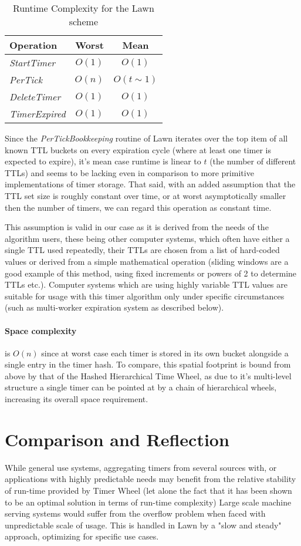 \documentclass[acmsmall]{acmart} %
\newcommand{\advcomplexity}[9]{
\begin{table}[h!]
	\begin{center}
		\begin{tabular}{l|c|c}
			\textbf{Operation} & \textbf{Worst} & \textbf{Mean} \\
			\hline
			\textit{StartTimer} & $O(#1)$ & $O(#2)$ \\
			\textit{PerTick} & $O(#3)$ & $O(#4)$ \\
			\textit{DeleteTimer} & $O(#5)$ & $O(#6)$ \\
			\textit{TimerExpired} & $O(#7)$ & $O(#8)$ \\
		\end{tabular}
		\caption{Runtime Complexity for #9 scheme}
	\end{center}
\end{table}
}
\begin{document}
\advcomplexity{1}{1}{n}{t\sim1}{1}{1}{1}{1}{the Lawn}

Since the \textit{PerTickBookkeeping} routine of Lawn iterates over the top item of all known TTL buckets on every expiration cycle (where at least one timer is expected to expire), it's mean case runtime is linear to $t$ (the number of different TTLs) and seems to be lacking even in comparison to more primitive implementations of timer storage. That said, with an added assumption that the TTL set size is roughly constant over time, or at worst asymptotically smaller then the number of timers, we can regard this operation as constant time.

This assumption is valid in our case as it is derived from the needs of the algorithm users, these being other computer systems, which often have either a single TTL used repeatedly, their TTLs are chosen from a list of hard-coded values or derived from a simple mathematical operation (sliding windows are a good example of this method, using fixed increments or powers of 2 to determine TTLs etc.). Computer systems which are using highly variable TTL values are suitable for usage with this timer algorithm only under specific circumstances (such as multi-worker expiration system as described below).


\paragraph{Space complexity} is $O(n)$ since at worst case each timer is stored in its own bucket alongside a single entry in the timer hash. To compare, this spatial footprint is bound from above by that of the Hashed Hierarchical Time Wheel, as due to it's multi-level structure a single timer can be pointed at by a chain of hierarchical wheels, increasing its overall space requirement.

\section{Comparison and Reflection}
While general use systems, aggregating timers from several sources with, or applications with highly predictable needs may benefit from the relative stability of run-time provided by Timer Wheel (let alone the fact that it has been shown to be an optimal solution in terms of run-time complexity) Large scale machine serving systems would suffer from the overflow problem when faced with unpredictable scale of usage. This is handled in Lawn by a "slow and steady" approach, optimizing for specific use cases.
\end{document}
